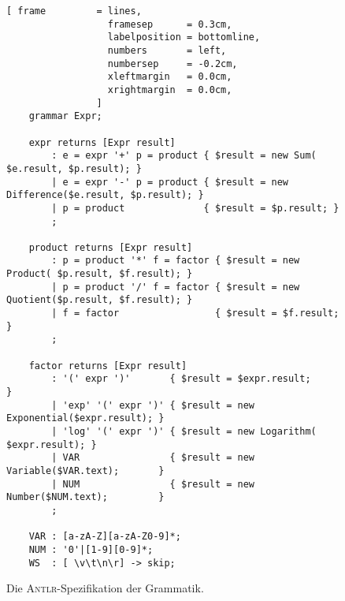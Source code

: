 \begin{figure}[!ht]
\centering
\begin{Verbatim}[ frame         = lines, 
                  framesep      = 0.3cm, 
                  labelposition = bottomline,
                  numbers       = left,
                  numbersep     = -0.2cm,
                  xleftmargin   = 0.0cm,
                  xrightmargin  = 0.0cm,
                ]
    grammar Expr;
    
    expr returns [Expr result]
        : e = expr '+' p = product { $result = new Sum(       $e.result, $p.result); }
        | e = expr '-' p = product { $result = new Difference($e.result, $p.result); }
        | p = product              { $result = $p.result; }    
        ;
    
    product returns [Expr result]
        : p = product '*' f = factor { $result = new Product( $p.result, $f.result); }
        | p = product '/' f = factor { $result = new Quotient($p.result, $f.result); }
        | f = factor                 { $result = $f.result; }
        ;
    
    factor returns [Expr result]
        : '(' expr ')'       { $result = $expr.result;                  }
        | 'exp' '(' expr ')' { $result = new Exponential($expr.result); }
        | 'log' '(' expr ')' { $result = new Logarithm(  $expr.result); }
        | VAR                { $result = new Variable($VAR.text);       }
        | NUM                { $result = new Number($NUM.text);         }
        ;
    
    VAR : [a-zA-Z][a-zA-Z0-9]*;
    NUM : '0'|[1-9][0-9]*;
    WS  : [ \v\t\n\r] -> skip; 
\end{Verbatim}
\vspace*{-0.3cm}
\caption{Die \textsc{Antlr}-Spezifikation der Grammatik.}
\label{fig:grammatik.g}
\end{figure}


